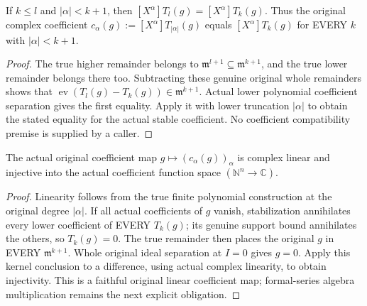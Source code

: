 \begin{theorem}
\label{hir:actual-original-taylor-coefficient-stabilization}
\leanok
If $k\le l$ and $|\alpha|<k+1$, then
$[X^\alpha]T_l(g)=[X^\alpha]T_k(g)$.
Thus the original complex coefficient
$c_\alpha(g):=[X^\alpha]T_{|\alpha|}(g)$ equals
$[X^\alpha]T_k(g)$ for EVERY $k$ with $|\alpha|<k+1$.
\end{theorem}
\begin{proof}
The true higher remainder belongs to $\mathfrak m^{l+1}\subseteq
\mathfrak m^{k+1}$, and the true lower remainder belongs there too.
Subtracting these genuine original whole remainders shows that
$\operatorname{ev}(T_l(g)-T_k(g))\in\mathfrak m^{k+1}$.
Actual lower polynomial coefficient separation gives the first equality.
Apply it with lower truncation $|\alpha|$ to obtain the stated equality
for the actual stable coefficient. No coefficient compatibility premise
is supplied by a caller.
\end{proof}

\begin{theorem}
\label{hir:actual-original-all-taylor-coefficients-faithful}
\leanok
The actual original coefficient map
$g\mapsto(c_\alpha(g))_\alpha$ is complex linear and injective into the
actual coefficient function space $(\mathbb N^n\to\mathbb C)$.
\end{theorem}
\begin{proof}
Linearity follows from the true finite polynomial construction at the
original degree $|\alpha|$. If all actual coefficients of $g$ vanish,
stabilization annihilates every lower coefficient of EVERY $T_k(g)$;
its genuine support bound annihilates the others, so $T_k(g)=0$.
The true remainder then places the original $g$ in EVERY
$\mathfrak m^{k+1}$. Whole original ideal separation at $I=0$ gives
$g=0$. Apply this kernel conclusion to a difference, using actual
complex linearity, to obtain injectivity. This is a faithful original
linear coefficient map; formal-series algebra multiplication remains the
next explicit obligation.
\end{proof}
